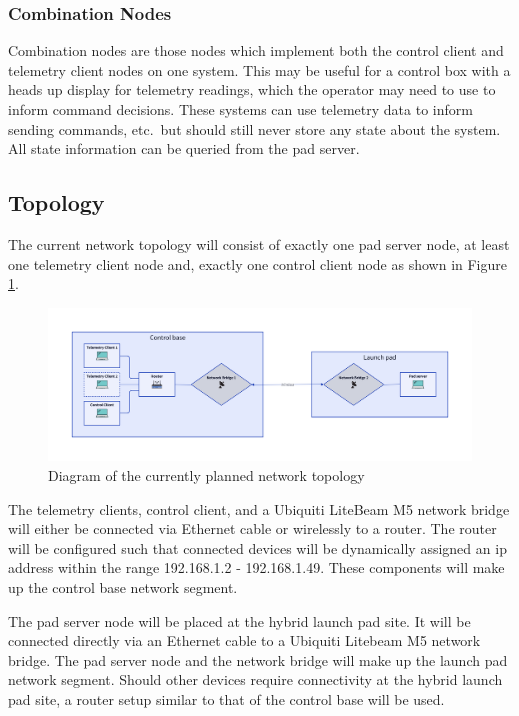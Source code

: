 \subsubsection{Combination Nodes}

Combination nodes are those nodes which implement both the control client and telemetry client nodes on one system.
This may be useful for a control box with a heads up display for telemetry readings, which the operator may need to use
to inform command decisions. These systems can use telemetry data to inform sending commands, etc.\ but should still
never store any state about the system. All state information can be queried from the pad server.

\subsection{Topology}

The current network topology will consist of exactly one pad server node, at least one telemetry client node and,
exactly one control client node as shown in Figure \ref{fig:ntwrk-tplgy}.

\begin{figure}[H]
    \center
    \includegraphics[width=6.75in]{assets/diagrams/network_top.png}
    \caption{Diagram of the currently planned network topology}
    \label{fig:ntwrk-tplgy}
\end{figure}

The telemetry clients, control client, and a Ubiquiti LiteBeam M5 network bridge will either be connected via Ethernet
cable or wirelessly to a router. The router will be configured such that connected devices will be dynamically assigned
an \gls{ip} address within the range 192.168.1.2 - 192.168.1.49. These components will make up the control base network
segment.

The pad server node will be placed at the hybrid launch pad site. It will be connected directly via an Ethernet cable
to a Ubiquiti Litebeam M5 network bridge. The pad server node and the network bridge will make up the launch pad
network segment. Should other devices require connectivity at the hybrid launch pad site, a router setup similar to
that of the control base will be used.

